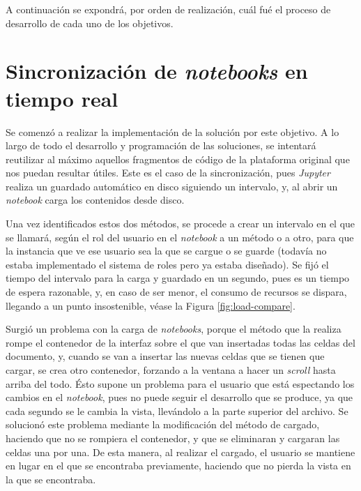 \documentclass[11pt,spanish,listoffigures]{tfgetsinf}
\begin{document}
A continuación se expondrá, por orden de realización, cuál fué el proceso de desarrollo de cada uno de los objetivos.



\section{Sincronización de \textit{notebooks} en tiempo real}
\label{sec:desarrollo-sincro}

Se comenzó a realizar la implementación de la solución por este objetivo. A lo largo de todo el desarrollo y programación de las soluciones, se intentará reutilizar al máximo aquellos fragmentos de código de la plataforma original que nos puedan resultar útiles. Este es el caso de la sincronización, pues \textit{Jupyter} realiza un guardado automático en disco siguiendo un intervalo, y, al abrir un \textit{notebook} carga los contenidos desde disco.

Una vez identificados estos dos métodos, se procede a crear un intervalo en el que se llamará, según el rol del usuario en el \textit{notebook} a un método o a otro, para que la instancia que ve ese usuario sea la que se cargue o se guarde (todavía no estaba implementado el sistema de roles pero ya estaba diseñado). Se fijó el tiempo del intervalo para la carga y guardado en un segundo, pues es un tiempo de espera razonable, y, en caso de ser menor, el consumo de recursos se dispara, llegando a un punto insostenible, véase la Figura \ref{fig:load-compare}.

Surgió un problema con la carga de \textit{notebooks}, porque el método que la realiza rompe el contenedor de la interfaz sobre el que van insertadas todas las celdas del documento, y, cuando se van a insertar las nuevas celdas que se tienen que cargar, se crea otro contenedor, forzando a la ventana a hacer un \textit{\gls{scroll}} hasta arriba del todo. Ésto supone un problema para el usuario que está espectando los cambios en el \textit{notebook}, pues no puede seguir el desarrollo que se produce, ya que cada segundo se le cambia la vista, llevándolo a la parte superior del archivo. Se solucionó este problema mediante la modificación del método de cargado, haciendo que no se rompiera el contenedor, y que se eliminaran y cargaran las celdas una por una. De esta manera, al realizar el cargado, el usuario se mantiene en lugar en el que se encontraba previamente, haciendo que no pierda la vista en la que se encontraba.
\end{document}
